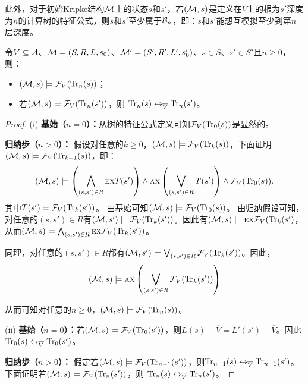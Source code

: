 此外，对于初始Kripke结构${\cal M}$上的状态$s$和$s'$，若$({\cal M},s)$是定义在$V$上的根为$s'$深度为$n$的计算树的特征公式，则$s$和$s'$至少属于${\cal B}_n$，即：$s$和$s'$能想互模拟至少到第$n$层深度。

\begin{lemma}\label{Bn:to:Tn}
	令$V\subseteq {\cal A}$、${\cal M}=(S, R, L,s_0)$、${\cal M}'=(S', R', L',s_0')$、$s\in S$、$s'\in S'$且$n\ge 0$，则：
	\begin{itemize}
		\item[(i)] $({\cal M},s)\models{\cal F}_V(\textrm{Tr}_n(s))$；
		\item[(ii)] 若$({\cal M},s)\models{\cal F}_V(\textrm{Tr}_n(s'))$，则
		$\textrm{Tr}_n(s) \leftrightarrow_{\overline V} \textrm{Tr}_n(s')$。
	\end{itemize}
\end{lemma}
\begin{proof}
	(i) \textbf{基始（$n=0$）：}从树的特征公式定义可知${\cal F}_V(\textrm{Tr}_0(s))$是显然的。

	\textbf{归纳步（$n>0$）：} 假设对任意的$k\geq 0$，$({\cal M},s)\models{\cal F}_V(\textrm{Tr}_k(s))$，下面证明$({\cal M},s)\models{\cal F}_V(\textrm{Tr}_{k+1}(s))$，即：
	\begin{equation*}
		({\cal M},s)\models \left(\bigwedge_{(s,s')\in R}
		\textsc{e} \textsc{x} T(s')\right)
		\wedge \textsc{a} \textsc{x}\left(\bigvee_{(s,s')\in R}
		T(s')\right)
		\wedge {\cal F}_V(\textrm{Tr}_0(s)).
	\end{equation*}
	其中$T(s') ={\cal F}_V(\textrm{Tr}_k(s'))$。 
	由基始可知$({\cal M},s)\models {\cal F}_V(\textrm{Tr}_0(s))$。
	由归纳假设可知，对任意的$(s,s') \in R$有$({\cal M}, s') \models {\cal F}_V(\textrm{Tr}_k(s'))$。因此有$({\cal M},s)\models \textsc{e} \textsc{x} {\cal F}_V(\textrm{Tr}_k(s')$，从而$({\cal M},s)\models \bigwedge_{(s,s')\in R}
	\textsc{e} \textsc{x} {\cal F}_V(\textrm{Tr}_k(s'))$。
	
	同理，对任意的$(s,s') \in R$都有$({\cal M}, s') \models \bigvee_{(s,s')\in R} {\cal F}_V(\textrm{Tr}_k(s') )$。因此，
	$$({\cal M},s)\models \textsc{a} \textsc{x}\left(\bigvee_{(s,s')\in R}
	{\cal F}_V(\textrm{Tr}_k(s') )\right)$$
	
	从而可知对任意的$n\geq 0$，$({\cal M},s)\models{\cal F}_V(\textrm{Tr}_n(s))$。
	
	
	
	(ii) \textbf{基始（$n=0$）：}若$({\cal M}, s)  \models {\cal F}_V(\textrm{Tr}_0(s'))$，则$L(s) - \overline V = L'(s') - \overline V$。因此$\textrm{Tr}_0(s) \leftrightarrow_{\overline V} \textrm{Tr}_0(s')$。
	
	\textbf{归纳步（$n>0$）：} 假定若$({\cal M},s)\models{\cal F}_V(\textrm{Tr}_{n-1}(s'))$，则$\textrm{Tr}_{n-1}(s) \leftrightarrow_{\overline V} \textrm{Tr}_{n-1}(s')$。下面证明若$({\cal M},s)\models{\cal F}_V(\textrm{Tr}_n(s'))$，则
	$\textrm{Tr}_n(s) \leftrightarrow_{\overline V} \textrm{Tr}_n(s')$。
	

\end{proof}
